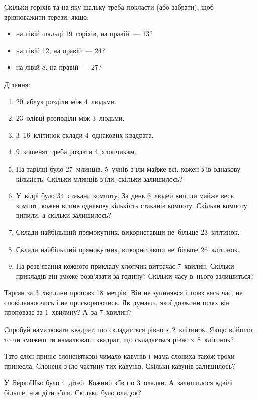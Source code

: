 \problem
Скільки горіхів та на яку шальку треба покласти (або забрати),
щоб врівноважити терези, якщо:
\begin{itemize}
    \item на лівій шальці 19~горіхів, на правій~--- 13?
    \item на лівій 12, на правій~--- 24?
    \item на лівій 8, на правій~--- 27?
\end{itemize}


\problem
Ділення:
\begin{enumerate}
    \item 20~яблук розділи між 4~людьми.
    \item 23~олівці розподіли між 3~людьми.
    \item З~16~клітинок склади 4~однакових квадрата.
    \item 9~кошенят треба роздати 4~хлопчикам.
    \item На тарілці було 27~млинців. 5~учнів з'їли майже всі,
    кожен з'їв однакову кількість.
    Скільки млинців з'їли, скільки залишилось?
    \item У~відрі було 34~стакани компоту.
    За день 6~людей випили майже весь компот,
    кожен випив однакову кількість стаканів компоту.
    Скільки компоту випили, а скільки залишилось?
    \item Склади найбільший прямокутник, використавши
    не~більше 23~клітинок.
    \item Склади найбільший прямокутник, використавши
    не~більше 26~клітинок.
    \item На розв'язання кожного прикладу хлопчик витрачає 7~хвилин.
    Скільки прикладів він зможе розв'язати за годину?
    Скільки часу в~нього залишиться?
\end{enumerate}


\problem
Тарган за 3~хвилини проповз 18~метрів.
Він не зупинявся і~повз весь час, не сповільнюючись і не прискорюючись.
Як думаєш, якої довжини шлях він проповзає за 1~хвилину?
А~за 7~хвилин?


\problem
Спробуй намалювати квадрат, що складається рівно з~2~клітинок.
Якщо вийшло, то чи зможеш ти намалювати квадрат,
що складається рівно з~8~клітинок?


\problem
Тато-слон приніс слоненяткові чимало кавунів
і~мама-слониха також трохи принесла.
Слоненя з’їло частину тих кавунів.
Скільки кавунів залишилось?


\problem
У~БеркоШко було 4~дітей. Кожний з’їв по 3~оладки.
А~залишилося вдвічі більше, ніж діти з’їли.
Скільки було оладок?


